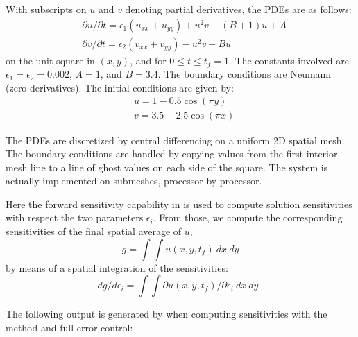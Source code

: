 With subscripts on $u$ and $v$ denoting partial derivatives, the PDEs
are as follows:
\begin{equation*}
\begin{split}
  &\partial u / \partial t = \epsilon_1 (u_{xx} + u_{yy})
                              + u^2 v - (B + 1) u + A \\
  &\partial v / \partial t = \epsilon_2 (v_{xx} + v_{yy})
                              - u^2 v + B  u
\end{split}
\end{equation*}
on the unit square in $(x,y)$, and for $0 \leq t \leq t_f = 1$.
The constants involved are $\epsilon_1 = \epsilon_2 = 0.002$, $A = 1$,
and $B = 3.4$.  The boundary conditions are Neumann (zero derivatives).
The initial conditions are given by:
\begin{equation*}
\begin{split}
  &u = 1 - 0.5 \cos(\pi y) \\
  &v = 3.5 - 2.5 \cos(\pi x)
\end{split}
\end{equation*}

The PDEs are discretized by central differencing on a uniform 2D spatial mesh.
The boundary conditions are handled by copying values from the first interior
mesh line to a line of ghost values on each side of the square.
The system is actually implemented on submeshes, processor by processor.

Here the forward sensitivity capability in {\idas} is used to compute
solution sensitivities with respect the two parameters $\epsilon_i$.
From those, we compute the corresponding sensitivities of the final spatial
average of $u$,
\begin{equation*}
  g = \int \int u(x,y,t_f) ~dx~dy
\end{equation*}
by means of a spatial integration of the sensitivities:
\begin{equation*}
  dg/d\epsilon_i = \int \int \partial u(x,y,t_f) / \partial \epsilon_i~dx~dy ~.
\end{equation*}


The following output is generated by  when computing
sensitivities with the  method and full error control:


